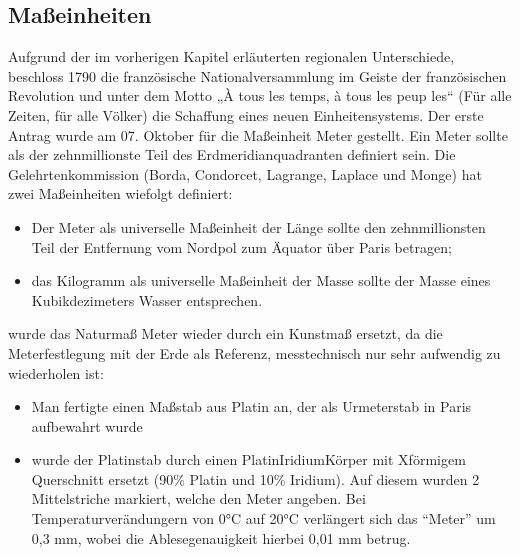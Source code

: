 \documentclass[letterpaper,10pt,english]{jupyterBook}
\begin{document}
\subsection{Maßeinheiten}
\label{\detokenize{content/1_Messen_Einheit:maszeinheiten}}
\sphinxAtStartPar
Aufgrund der im vorherigen Kapitel erläuterten regionalen Unterschiede, beschloss 1790 die französische Nationalversammlung im Geiste der französischen Revolution und unter dem Motto „À tous les temps, à tous les peup\sphinxhyphen{} les“ (Für alle Zeiten, für alle Völker) die Schaffung eines neuen Einheitensystems.
Der erste Antrag wurde am 07. Oktober für die Maßeinheit Meter gestellt. Ein Meter sollte als der zehnmillionste Teil des Erdmeridianquadranten definiert sein. Die Gelehrtenkommission (Borda, Condorcet, Lagrange, Laplace und Monge) hat zwei Maßeinheiten wiefolgt definiert:
\begin{itemize}
\item {} 
\sphinxAtStartPar
Der Meter als universelle Maßeinheit der Länge sollte den zehnmillionsten Teil der Entfernung vom Nordpol zum Äquator über Paris betragen;

\item {} 
\sphinxAtStartPar
das Kilogramm als universelle Maßeinheit der Masse sollte der Masse eines Kubikdezimeters Wasser entsprechen.

\end{itemize}

 wurde das Naturmaß Meter wieder durch ein Kunstmaß ersetzt, da die Meterfestlegung mit der Erde als Referenz, messtechnisch nur sehr aufwendig zu wiederholen ist:
\begin{itemize}
\item {} 
\sphinxAtStartPar
Man fertigte einen Maßstab aus Platin an, der als Urmeterstab in Paris aufbewahrt wurde

\item {} 
 wurde der Platinstab durch einen Platin\sphinxhyphen{}Iridium\sphinxhyphen{}Körper mit X\sphinxhyphen{}förmigem Querschnitt ersetzt (90\% Platin und 10\% Iridium). Auf diesem wurden 2 Mittelstriche markiert, welche den Meter angeben. Bei Temperaturverändungern von 0°C auf 20°C verlängert sich das “Meter” um 0,3 mm,  wobei die Ablesegenauigkeit hierbei 0,01 mm betrug.

\end{itemize}

\sphinxAtStartPar
{}
\end{document}
